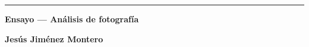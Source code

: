 \documentclass[11pt]{article}
\begin{document}
\begin{titlepage}

	\centering
	\hrule
	\vspace{1cm}
	{\bfseries\Huge Ensayo --- Análisis de fotografía \par}
	\vspace{0.5cm}
	\large{\textbf{Jesús Jiménez Montero} \par}

	\vspace{1cm}

	\vspace{0.5cm}

	\vspace{1cm}
	\hrulefill
\end{titlepage}
\newpage

\renewcommand{\listfigurename}{\textbf{Lista de figuras}}


\listoffigures
\newpage
\end{document}
